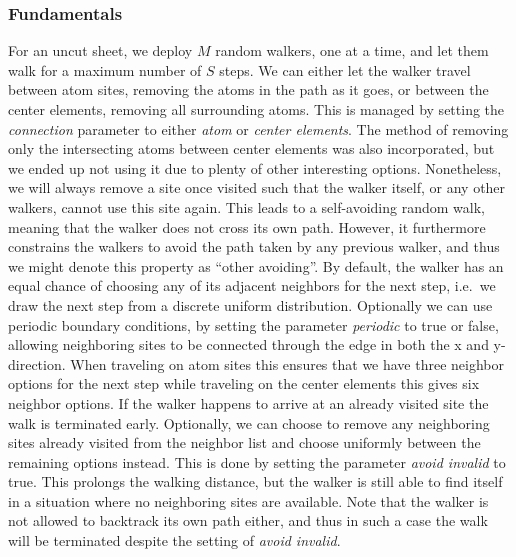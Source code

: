 \subsubsection{Fundamentals} %
For an uncut sheet, we deploy $M$ random walkers, one at a time, and let them
walk for a maximum number of $S$ steps. We can either let the walker travel
between atom sites, removing the atoms in the path as it goes, or between the
center elements, removing all surrounding atoms. This is managed by setting the
\textit{connection} parameter to either \textit{atom} or \textit{center
elements}. The method of removing only the intersecting atoms between center
elements was also incorporated, but we ended up not using it due to plenty of
other interesting options. Nonetheless, we will always remove a site once
visited such that the walker itself, or any other walkers, cannot use this site
again. This leads to a self-avoiding random walk, meaning that the walker does
not cross its own path. However, it furthermore constrains the walkers to avoid
the path taken by any previous walker, and thus we might denote this property as
``other avoiding''. By default, the walker has an equal chance of choosing any
of its adjacent neighbors for the next step, i.e.\ we draw the next step from a
discrete uniform distribution. Optionally we can use periodic boundary
conditions, by setting the parameter \textit{periodic} to true or false,
allowing neighboring sites to be connected through the edge in both the x and
y-direction. When traveling on atom sites this ensures that we have three
neighbor options for the next step while traveling on the center elements this
gives six neighbor options. If the walker happens to arrive at an already
visited site the walk is terminated early. Optionally, we can choose to remove
any neighboring sites already visited from the neighbor list and choose
uniformly between the remaining options instead. This is done by setting the
parameter \textit{avoid invalid} to true. This prolongs the walking distance,
but the walker is still able to find itself in a situation where no neighboring
sites are available. Note that the walker is not allowed to backtrack its own
path either, and thus in such a case the walk will be terminated despite the
setting of \textit{avoid invalid}.


